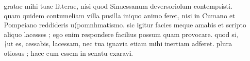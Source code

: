 


 gratae mihi tuae litterae, nisi quod Sinuessanum deversoriolum contempsisti. quam quidem contumeliam villa pusilla iniquo animo feret, nisi in Cumano et Pompeiano reddideris u(pomnhmatismo\n . sic igitur facies meque amabis et scripto aliquo lacesses ; ego enim respondere facilius possum quam provocare. quod si, †ut es, cessabis, lacessam, nec tua ignavia etiam mihi inertiam adferet. plura otiosus ; haec cum essem in senatu exaravi.
